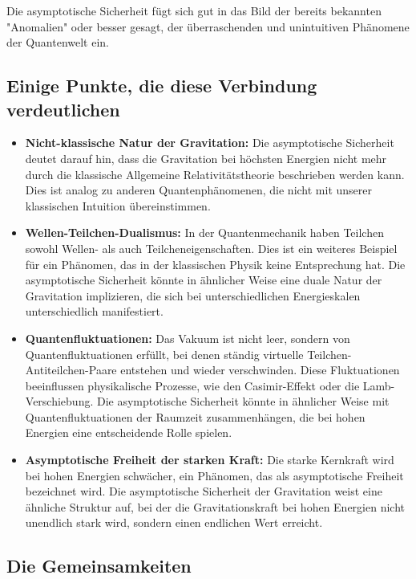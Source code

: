 \documentclass{article}
\begin{document}
Die asymptotische Sicherheit fügt sich gut in das Bild der bereits bekannten "Anomalien" oder besser gesagt, der überraschenden und unintuitiven Phänomene der Quantenwelt ein.

\subsection{Einige Punkte, die diese Verbindung verdeutlichen}

\begin{itemize}
	\item \textbf{Nicht-klassische Natur der Gravitation:} Die asymptotische Sicherheit deutet darauf hin, dass die Gravitation bei höchsten Energien nicht mehr durch die klassische Allgemeine Relativitätstheorie beschrieben werden kann. Dies ist analog zu anderen Quantenphänomenen, die nicht mit unserer klassischen Intuition übereinstimmen.
	\item \textbf{Wellen-Teilchen-Dualismus:} In der Quantenmechanik haben Teilchen sowohl Wellen- als auch Teilcheneigenschaften. Dies ist ein weiteres Beispiel für ein Phänomen, das in der klassischen Physik keine Entsprechung hat. Die asymptotische Sicherheit könnte in ähnlicher Weise eine duale Natur der Gravitation implizieren, die sich bei unterschiedlichen Energieskalen unterschiedlich manifestiert.
	\item \textbf{Quantenfluktuationen:} Das Vakuum ist nicht leer, sondern von Quantenfluktuationen erfüllt, bei denen ständig virtuelle Teilchen-Antiteilchen-Paare entstehen und wieder verschwinden. Diese Fluktuationen beeinflussen physikalische Prozesse, wie den Casimir-Effekt oder die Lamb-Verschiebung. Die asymptotische Sicherheit könnte in ähnlicher Weise mit Quantenfluktuationen der Raumzeit zusammenhängen, die bei hohen Energien eine entscheidende Rolle spielen.
	\item \textbf{Asymptotische Freiheit der starken Kraft:} Die starke Kernkraft wird bei hohen Energien schwächer, ein Phänomen, das als asymptotische Freiheit bezeichnet wird. Die asymptotische Sicherheit der Gravitation weist eine ähnliche Struktur auf, bei der die Gravitationskraft bei hohen Energien nicht unendlich stark wird, sondern einen endlichen Wert erreicht.
\end{itemize}

\subsection{Die Gemeinsamkeiten}
\end{document}
